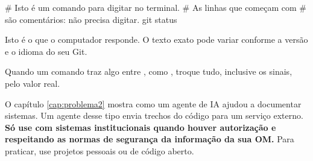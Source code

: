 \begin{terminal}
# Isto é um comando para digitar no terminal.
# As linhas que começam com # são comentários: não precisa digitar.
git status
\end{terminal}

\begin{saida}
Isto é o que o computador responde. O texto exato pode variar
conforme a versão e o idioma do seu Git.
\end{saida}

Quando um comando traz algo entre , como , troque tudo, inclusive os sinais, pelo valor real.

\begin{atencao}
O capítulo \ref{cap:problema2} mostra como um agente de IA ajudou a documentar sistemas. Um agente desse tipo envia trechos do código para um serviço externo. \textbf{Só use com sistemas institucionais quando houver autorização e respeitando as normas de segurança da informação da sua OM.} Para praticar, use projetos pessoais ou de código aberto.
\end{atencao}
